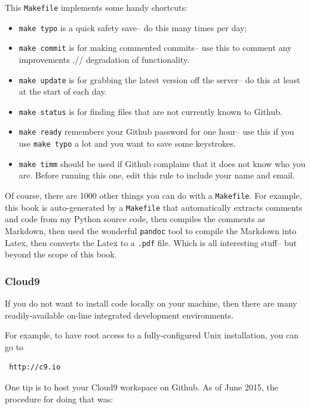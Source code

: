 This \texttt{Makefile} implements some handy shortcuts:

\begin{itemize}
\itemsep1pt\parskip0pt
\item
  \texttt{make\ typo} is a quick safety save-- do this many times per
  day;
\item
  \texttt{make\ commit} is for making commented commits-- use this to
  comment any improvements .// degradation of functionality.
\item
  \texttt{make\ update} is for grabbing the latest version off the
  server-- do this at least at the start of each day.
\item
  \texttt{make\ status} is for finding files that are not currently
  known to Github.
\item
  \texttt{make\ ready} remembers your Github password for one hour-- use
  this if you use \texttt{make\ typo} a lot and you want to save some
  keystrokes.
\item
  \texttt{make\ timm} should be used if Github complains that it does
  not know who you are. Before running this one, edit this rule to
  include your name and email.
\end{itemize}

Of course, there are 1000 other things you can do with a
\texttt{Makefile}. For example, this book is auto-generated by a
\texttt{Makefile} that automatically extracts comments and code from my
Python source code, then compiles the comments as Markdown, then used
the wonderful \texttt{pandoc} tool to compile the Markdown into Latex,
then converts the Latex to a \texttt{.pdf} file. Which is all
interesting stuff-- but beyond the scope of this book.

\subsubsection{Cloud9}\label{cloud9}

If you do not want to install code locally on your machine, then there
are many readily-available on-line integrated development environments.

For example, to have root access to a fully-configured Unix
installation, you can go to

\begin{lstlisting}
 http://c9.io
\end{lstlisting}

One tip is to host your Cloud9 workspace on Github. As of June 2015, the
procedure for doing that was:

